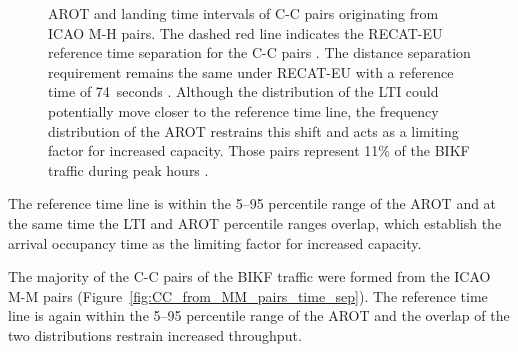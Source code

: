 \begin{figure}[h]
    \caption[AROT and LTI of C-C pairs originating from ICAO M-H pairs]{AROT and landing time intervals of C-C pairs originating from ICAO M-H pairs. The dashed red line indicates the RECAT-EU reference time separation for the C-C pairs \protect{}. The distance separation requirement remains the same under RECAT-EU with a reference time of 74~seconds \protect{}. Although the distribution of the LTI could potentially move closer to the reference time line, the frequency distribution of the AROT restrains this shift and acts as a limiting factor for increased capacity. Those pairs represent 11\% of the BIKF traffic during peak hours .}
    \label{fig:CC_from_MH_pairs_time_sep}
\end{figure}

The reference time line is within the 5--95 percentile range of the AROT and at the same time the LTI and AROT percentile ranges overlap, which establish the arrival occupancy time as the limiting factor for increased capacity.


The majority of the C-C pairs of the BIKF traffic were formed from the ICAO M-M pairs (Figure~\ref{fig:CC_from_MM_pairs_time_sep}). The reference time line is again within the 5--95 percentile range of the AROT and the overlap of the two distributions restrain increased throughput.

